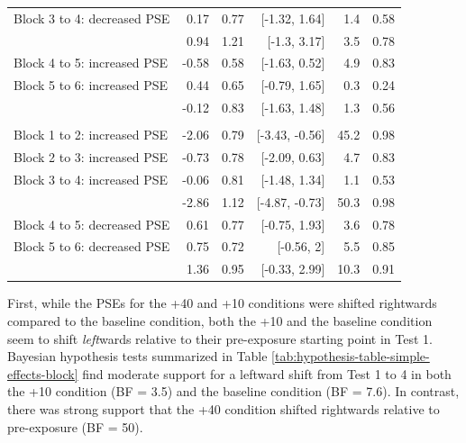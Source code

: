 \documentclass[
  11pt,
  man,mask,floatsintext]{apa6}
\begin{document}
\begin{table}[H]
\begin{tabular}[t]{>{\raggedright\arraybackslash}p{15em}rrrrr}
\hspace{1em}Block 3 to 4: decreased PSE & 0.17 & 0.77 & {}[-1.32, 1.64] & 1.4 & 0.58\\
\hspace{1em}{\em Block 1 to 4: decreased PSE} & 0.94 & 1.21 & {}[-1.3, 3.17] & 3.5 & 0.78\\
\hspace{1em}Block 4 to 5: increased PSE & -0.58 & 0.58 & {}[-1.63, 0.52] & 4.9 & 0.83\\
\hspace{1em}Block 5 to 6: increased PSE & 0.44 & 0.65 & {}[-0.79, 1.65] & 0.3 & 0.24\\
\hspace{1em}{\em Block 4 to 6: increased PSE} & -0.12 & 0.83 & {}[-1.63, 1.48] & 1.3 & 0.56\\
\addlinespace[0.3em]
\multicolumn{6}{l}{\textbf{Difference between blocks: +40}}\\
\hspace{1em}Block 1 to 2: increased PSE & -2.06 & 0.79 & {}[-3.43, -0.56] & 45.2 & 0.98\\
\hspace{1em}Block 2 to 3: increased PSE & -0.73 & 0.78 & {}[-2.09, 0.63] & 4.7 & 0.83\\
\hspace{1em}Block 3 to 4: increased PSE & -0.06 & 0.81 & {}[-1.48, 1.34] & 1.1 & 0.53\\
\hspace{1em}{\em Block 1 to 4: increased PSE} & -2.86 & 1.12 & {}[-4.87, -0.73] & 50.3 & 0.98\\
\hspace{1em}Block 4 to 5: decreased PSE & 0.61 & 0.77 & {}[-0.75, 1.93] & 3.6 & 0.78\\
\hspace{1em}Block 5 to 6: decreased PSE & 0.75 & 0.72 & {}[-0.56, 2] & 5.5 & 0.85\\
\hspace{1em}{\em Block 4 to 6: decreased PSE} & 1.36 & 0.95 & {}[-0.33, 2.99] & 10.3 & 0.91\\
\bottomrule
\end{tabular}
\end{table}

First, while the PSEs for the +40 and +10 conditions were shifted rightwards compared to the baseline condition, both the +10 and the baseline condition seem to shift \emph{left}wards relative to their pre-exposure starting point in Test 1. Bayesian hypothesis tests summarized in Table \ref{tab:hypothesis-table-simple-effects-block} find moderate support for a leftward shift from Test 1 to 4 in both the +10 condition (BF = 3.5) and the baseline condition (BF = 7.6). In contrast, there was strong support that the +40 condition shifted rightwards relative to pre-exposure (BF = 50).
\end{document}
